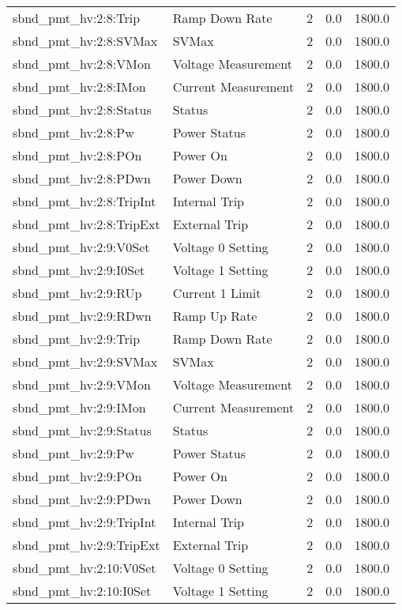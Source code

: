 \begin{center}
\begin{longtable}{l | l l l l }
sbnd\_pmt\_hv:2:8:Trip & Ramp Down Rate & 2 & 0.0 & 1800.0\\ 
sbnd\_pmt\_hv:2:8:SVMax & SVMax & 2 & 0.0 & 1800.0\\ 
sbnd\_pmt\_hv:2:8:VMon & Voltage Measurement & 2 & 0.0 & 1800.0\\ 
sbnd\_pmt\_hv:2:8:IMon & Current Measurement & 2 & 0.0 & 1800.0\\ 
sbnd\_pmt\_hv:2:8:Status & Status & 2 & 0.0 & 1800.0\\ 
sbnd\_pmt\_hv:2:8:Pw & Power Status & 2 & 0.0 & 1800.0\\ 
sbnd\_pmt\_hv:2:8:POn & Power On & 2 & 0.0 & 1800.0\\ 
sbnd\_pmt\_hv:2:8:PDwn & Power Down & 2 & 0.0 & 1800.0\\ 
sbnd\_pmt\_hv:2:8:TripInt & Internal Trip & 2 & 0.0 & 1800.0\\ 
sbnd\_pmt\_hv:2:8:TripExt & External Trip & 2 & 0.0 & 1800.0\\ 
sbnd\_pmt\_hv:2:9:V0Set & Voltage 0 Setting & 2 & 0.0 & 1800.0\\ 
sbnd\_pmt\_hv:2:9:I0Set & Voltage 1 Setting & 2 & 0.0 & 1800.0\\ 
sbnd\_pmt\_hv:2:9:RUp & Current 1 Limit & 2 & 0.0 & 1800.0\\ 
sbnd\_pmt\_hv:2:9:RDwn & Ramp Up Rate & 2 & 0.0 & 1800.0\\ 
sbnd\_pmt\_hv:2:9:Trip & Ramp Down Rate & 2 & 0.0 & 1800.0\\ 
sbnd\_pmt\_hv:2:9:SVMax & SVMax & 2 & 0.0 & 1800.0\\ 
sbnd\_pmt\_hv:2:9:VMon & Voltage Measurement & 2 & 0.0 & 1800.0\\ 
sbnd\_pmt\_hv:2:9:IMon & Current Measurement & 2 & 0.0 & 1800.0\\ 
sbnd\_pmt\_hv:2:9:Status & Status & 2 & 0.0 & 1800.0\\ 
sbnd\_pmt\_hv:2:9:Pw & Power Status & 2 & 0.0 & 1800.0\\ 
sbnd\_pmt\_hv:2:9:POn & Power On & 2 & 0.0 & 1800.0\\ 
sbnd\_pmt\_hv:2:9:PDwn & Power Down & 2 & 0.0 & 1800.0\\ 
sbnd\_pmt\_hv:2:9:TripInt & Internal Trip & 2 & 0.0 & 1800.0\\ 
sbnd\_pmt\_hv:2:9:TripExt & External Trip & 2 & 0.0 & 1800.0\\ 
sbnd\_pmt\_hv:2:10:V0Set & Voltage 0 Setting & 2 & 0.0 & 1800.0\\ 
sbnd\_pmt\_hv:2:10:I0Set & Voltage 1 Setting & 2 & 0.0 & 1800.0\\ 

\end{longtable}
\end{center}
